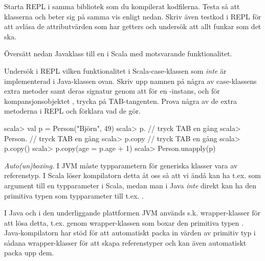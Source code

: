\Subtask Starta REPL i samma bibliotek som du kompilerat kodfilerna. Testa så att klasserna  och  beter sig på samma vis enligt nedan. Skriv även testkod i REPL för att avläsa de attributvärden som har getters och undersök att allt funkar som det ska.


\Subtask Översätt nedan Javaklass  till en  i Scala med  motsvarande funktionalitet.




\Subtask\Pen Undersök i REPL vilken funktionalitet i Scala-case-klassen  som \emph{inte} är implementerad i Java-klassen  ovan. Skriv upp namnen på några av case-klassens extra metoder samt deras signatur genom att för en -instans, och för kompansjonsobjektet , trycka på TAB-tangenten. Prova några av de extra metoderna i REPL och förklara vad de gör.

\begin{REPL}
scala> val p = Person("Björn", 49)
scala> p.      // tryck TAB en gång
scala> Person. // tryck TAB en gång
scala> p.copy  // tryck TAB en gång
scala> p.copy()
scala> p.copy(age = p.age + 1)
scala> Person.unapply(p)
\end{REPL}


\Task \emph{Auto(un)boxing.} I JVM måste typparametern för generiska klasser vara av referenstyp. I Scala löser kompilatorn detta åt oss så att vi ändå kan ha t.ex.  som argument till en typparameter i Scala, medan man i Java \emph{inte} direkt kan ha den primitiva typen  som typparameter till t.ex. .

I Java och i den underliggande plattformen JVM används s.k. wrapper-klasser för att lösa detta, t.ex. genom wrapper-klassen  som boxar den primitiva typen . Java-kompilatorn har stöd för att automatiskt packa in värden av primitiv typ i sådana wrapper-klasser för att skapa referenstyper och kan även automatiskt packa upp dem.

